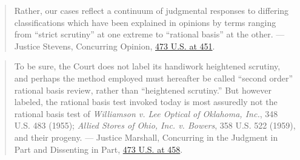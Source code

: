 \documentclass[12pt]{article}
\begin{document}
\begin{quote}
Rather, our cases reflect a continuum of judgmental responses to differing classifications which have been explained in opinions by terms ranging from ``strict scrutiny'' at one extreme to ``rational basis'' at the other.
--- Justice Stevens, Concurring Opinion, \href{https://supreme.justia.com/cases/federal/us/473/432/}{473 U.S. at 451}.
\end{quote}

\begin{quote}
To be sure, the Court does not label its handiwork heightened scrutiny, and perhaps the method employed must hereafter be called ``second order'' rational basis review, rather than ``heightened scrutiny.'' But however labeled, the rational basis test invoked today is most assuredly not the rational basis test of \textit{Williamson v. Lee Optical of Oklahoma, Inc.}, 348 U.S. 483 (1955); \textit{Allied Stores of Ohio, Inc. v. Bowers}, 358 U.S. 522 (1959), and their progeny.
--- Justice Marshall, Concurring in the Judgment in Part and Dissenting in Part, \href{https://supreme.justia.com/cases/federal/us/473/432/}{473 U.S. at 458}.
\end{quote}
\end{document}
